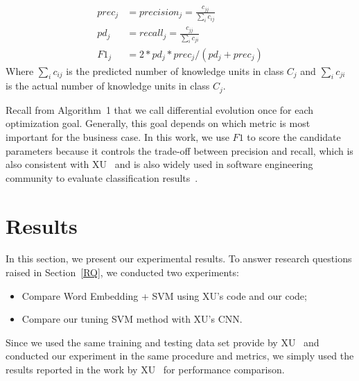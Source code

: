 \documentclass[sigconf]{acmart}
\theoremstyle{break}
\newcommand{\bi}{\begin{itemize}[leftmargin=0.4cm]}
\newcommand{\ei}{\end{itemize}}
\begin{document}
{\[
\begin{array}{ll}
prec_j &= precision_j = \frac{c_{jj}}{\sum_{i}c_{ij}}\\
pd_j &= recall_j = \frac{c_{jj}}{\sum_{i}c_{ji}}\\ 
F1_{j} &= 2*pd_j*prec_j/(pd_j + prec_j)
\end{array}
\]}
Where $\sum_{i}c_{ij}$ is the predicted number of knowledge units in class $C_j$ 
and ${\sum_{i}c_{ji}}$ is the actual number of knowledge units in class $C_j$.


Recall from Algorithm~1 that we call differential evolution once for each
optimization goal. Generally, this goal depends on which metric is most important for
the business case. In this work, we use $F1$ to score the candidate parameters because it controls
the trade-off between precision and recall, which is also consistent with XU~\cite{xu2016predicting}
and is also widely used in software engineering
community to evaluate classification results~\cite{wang2016automatically,menzies2007data,fu2016tuning,kim2008classifying}.


\section{Results}\label{results}
In this section, we present our experimental results. To answer research questions raised in
Section~\ref{RQ}, we conducted two experiments:
\bi
\item
Compare   Word Embedding + SVM using XU's code and our code;
\item
Compare our tuning SVM method with XU's CNN.

\ei
Since we used the same training and testing data set provide by XU~\cite{xu2016predicting} and conducted our experiment in the same procedure and metrics, we simply used the results reported in the work by XU~\cite{xu2016predicting} for performance comparison. 
\end{document}
